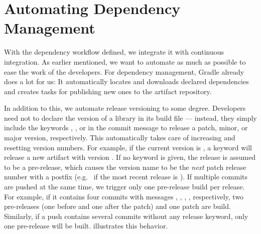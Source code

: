 \section{Automating Dependency Management}\label{sec:automating_vm}
With the dependency workflow defined, we integrate it with continuous integration. As earlier mentioned, we want to automate as much as possible to ease the work of the developers. For dependency management, Gradle already does a lot for us: It automatically locates and downloads declared dependencies and creates tasks for publishing new ones to the artifact repository.

In addition to this, we automate release versioning to some degree. Developers need not to declare the version of a library in its build file --- instead, they simply include the keywords , , or  in the commit message to release a patch, minor, or major version, respectively. This automatically takes care of increasing and resetting version numbers. For example, if the current version is , a  keyword will release a new artifact with version . If no keyword is given, the release is assumed to be a pre-release, which causes the version name to be the \emph{next} patch release number with a  postfix (e.g.\  if the most recent release is ). If multiple commits are pushed at the same time, we trigger only one pre-release build per release. For example, if it contains four commits with messages , , , , respectively, two pre-releases (one before and one after the patch) and one patch are build. Similarly, if a push contains several commits without any release keyword, only one pre-release will be built.  illustrates this behavior.

